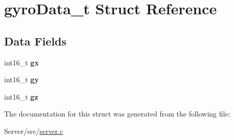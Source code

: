 \hypertarget{structgyroData__t}{}\section{gyro\+Data\+\_\+t Struct Reference}
\label{structgyroData__t}
\subsection*{Data Fields}
\begin{DoxyCompactItemize}
\item 
int16\+\_\+t {\bfseries gx}\hypertarget{structgyroData__t_a6a89679f759277e4434d804297e927bc}{}\label{structgyroData__t_a6a89679f759277e4434d804297e927bc}

\item 
int16\+\_\+t {\bfseries gy}\hypertarget{structgyroData__t_a560bf714745c03d0c2fad873a3a6f641}{}\label{structgyroData__t_a560bf714745c03d0c2fad873a3a6f641}

\item 
int16\+\_\+t {\bfseries gz}\hypertarget{structgyroData__t_af09c115aebe9fd2efd19fd0f2cf456b0}{}\label{structgyroData__t_af09c115aebe9fd2efd19fd0f2cf456b0}

\end{DoxyCompactItemize}


The documentation for this struct was generated from the following file\+:\begin{DoxyCompactItemize}
\item 
Server/src/\hyperlink{server_8c}{server.\+c}\end{DoxyCompactItemize}
